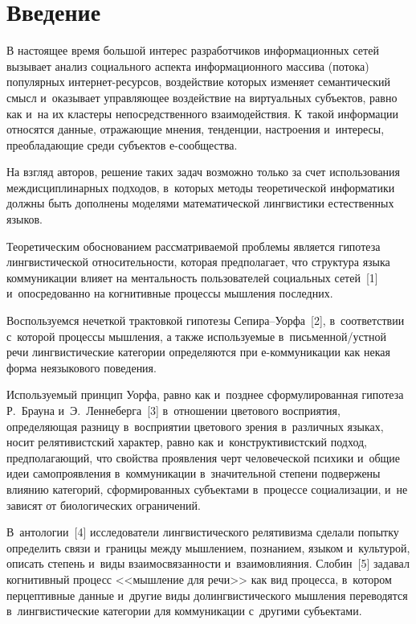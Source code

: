 \begin{multicols}{2}

\label{st\stat}


\section{Введение}

  В настоящее время большой интерес разработчиков информационных сетей 
вызывает анализ социального аспекта информационного массива (потока) 
популярных ин\-тер\-нет-ре\-сур\-сов, воздействие которых изменяет 
семантический смысл и~оказывает управляющее воздействие на виртуальных 
субъектов, равно как и~на их кластеры непосредственного взаимодействия. 
К~такой информации относятся данные, отражающие мнения, тенденции, 
настроения и~интересы, преобладающие среди субъектов е-со\-об\-ще\-ства.
  
  На взгляд авторов, решение таких задач возможно только за счет 
использования междисциплинарных подходов, в~которых методы 
теоретической информатики должны быть дополнены моделями 
математической лингвистики естественных языков.
  
  Теоретическим обоснованием рассматриваемой проблемы является гипотеза 
лингвистической относительности, которая предполагает, что структура языка 
коммуникации влияет на ментальность пользователей социальных сетей~[1] 
и~опосредованно на когнитивные процессы мышления последних. 

Воспользуемся нечеткой трактовкой гипотезы Се\-пи\-ра--Уор\-фа~[2], 
в~соответствии с~которой процессы мышления, а также используемые 
в~письменной/устной речи лингвистические категории определяются при 
е-ком\-му\-ни\-ка\-ции как некая форма неязыкового поведения.
  
  Используемый принцип Уорфа, равно как и~позднее сформулированная 
гипотеза Р.~Брауна и~Э.~Леннеберга~[3] в~отношении цветового восприятия, 
определяющая разницу в~восприятии цветового зрения в~различных языках, 
носит релятивистский характер, равно как и~конструктивистский подход, 
предполагающий, что свойства проявления черт человеческой психики и~общие 
идеи самопроявления в~коммуникации в~значительной степени подвержены 
влиянию категорий, сформированных субъектами в~процессе социализации, 
и~не зависят от биологических ограничений.
  
  В~антологии~[4] 
исследователи лингвистического релятивизма сделали попытку определить 
связи и~границы между мышлением, познанием, языком и~культурой, описать 
степень и~виды взаимосвязанности и~взаимовлияния. Слобин~[5] 
задавал когнитивный процесс <<мышление для речи>> как вид процесса, 
в~котором перцептивные данные и~другие виды долингвистического мышления 
переводятся в~лингвистические категории для коммуникации с~другими 
субъ\-ек\-тами. 
  

\end{multicols}

